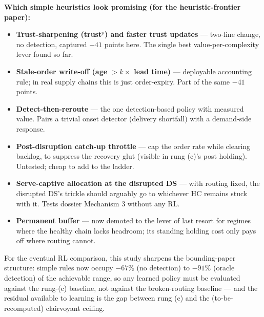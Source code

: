 \documentclass[11pt]{article}
\begin{document}
\textbf{Which simple heuristics look promising (for the heuristic-frontier paper):}
\begin{itemize}
\item \textbf{Trust-sharpening (trust$^{p}$) and faster trust updates} --- two-line change,
no detection, captured $-41$ points here. The single best value-per-complexity lever found
so far.
\item \textbf{Stale-order write-off (age $> k\times$ lead time)} --- deployable accounting
rule; in real supply chains this is just order-expiry. Part of the same $-41$ points.
\item \textbf{Detect-then-reroute} --- the one detection-based policy with measured value.
Pairs a trivial onset detector (delivery shortfall) with a demand-side response.
\item \textbf{Post-disruption catch-up throttle} --- cap the order rate while clearing
backlog, to suppress the recovery glut (visible in rung (c)'s post holding). Untested;
cheap to add to the ladder.
\item \textbf{Serve-captive allocation at the disrupted DS} --- with routing fixed, the
disrupted DS's trickle should arguably go to whichever HC remains stuck with it. Tests
dossier Mechanism 3 without any RL.
\item \textbf{Permanent buffer} --- now demoted to the lever of last resort for regimes where
the healthy chain lacks headroom; its standing holding cost only pays off where routing
cannot.
\end{itemize}

For the eventual RL comparison, this study sharpens the bounding-paper structure: simple
rules now occupy $-67\%$ (no detection) to $-91\%$ (oracle detection) of the achievable
range, so any learned policy must be evaluated against the rung-(c) baseline, not against
the broken-routing baseline --- and the residual available to learning is the gap between
rung (c) and the (to-be-recomputed) clairvoyant ceiling.
\end{document}
